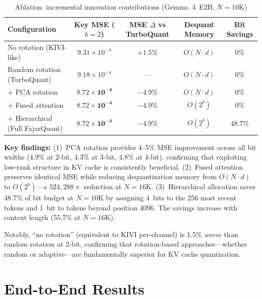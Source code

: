 \documentclass[10pt,twocolumn]{article}
\begin{document}
\begin{table}[t]
\centering
\small
\caption{Ablation: incremental innovation contributions (Gemma~4~E2B, $N{=}10$K)}
\label{tab:ablation}
\begin{tabular}{lcccc}
\toprule
Configuration & Key MSE ($b{=}2$) & MSE $\Delta$ vs TurboQuant & Dequant Memory & Bit Savings \\
\midrule
No rotation (KIVI-like) & $9.31 \times 10^{-4}$ & $+1.5\%$ & $O(N \cdot d)$ & 0\% \\
Random rotation (TurboQuant) & $9.18 \times 10^{-4}$ & --- & $O(N \cdot d)$ & 0\% \\
\midrule
$+$ PCA rotation & $\mathbf{8.72 \times 10^{-4}}$ & $-4.9\%$ & $O(N \cdot d)$ & 0\% \\
$+$ Fused attention & $\mathbf{8.72 \times 10^{-4}}$ & $-4.9\%$ & $O(2^b)$ & 0\% \\
$+$ Hierarchical (Full FajarQuant) & $\mathbf{8.72 \times 10^{-4}}$ & $-4.9\%$ & $O(2^b)$ & $48.7\%$ \\
\bottomrule
\end{tabular}
\end{table}

\textbf{Key findings:} (1)~PCA rotation provides 4--5\% MSE improvement across all bit widths (4.9\% at 2-bit, 4.3\% at 3-bit, 4.8\% at 4-bit), confirming that exploiting low-rank structure in KV cache is consistently beneficial. (2)~Fused attention preserves identical MSE while reducing dequantization memory from $O(N \!\cdot\! d)$ to $O(2^b)$---a $524{,}288\times$ reduction at $N{=}16$K. (3)~Hierarchical allocation saves 48.7\% of bit budget at $N{=}10$K by assigning 4~bits to the 256 most recent tokens and 1~bit to tokens beyond position 4096. The savings increase with context length (55.7\% at $N{=}16$K).

Notably, ``no rotation'' (equivalent to KIVI per-channel) is 1.5\% \textit{worse} than random rotation at 2-bit, confirming that rotation-based approaches---whether random or adaptive---are fundamentally superior for KV cache quantization.

\section{End-to-End Results}
\end{document}
